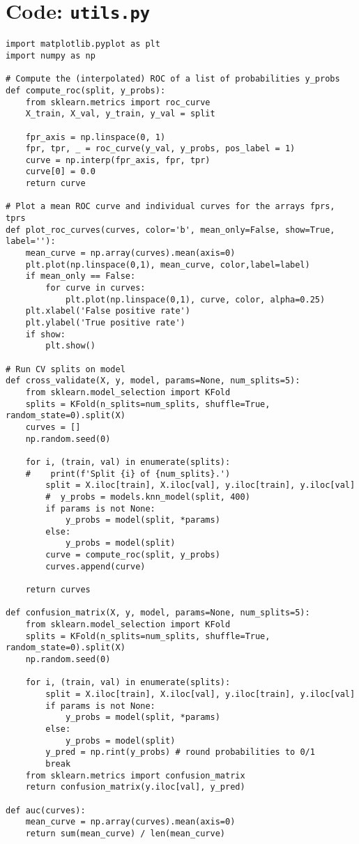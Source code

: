 \documentclass[11pt]{article}
\begin{document}
\section{Code: \texttt{utils.py}}
\begin{verbatim}
import matplotlib.pyplot as plt
import numpy as np

# Compute the (interpolated) ROC of a list of probabilities y_probs
def compute_roc(split, y_probs):
    from sklearn.metrics import roc_curve
    X_train, X_val, y_train, y_val = split

    fpr_axis = np.linspace(0, 1)
    fpr, tpr, _ = roc_curve(y_val, y_probs, pos_label = 1)
    curve = np.interp(fpr_axis, fpr, tpr)
    curve[0] = 0.0
    return curve

# Plot a mean ROC curve and individual curves for the arrays fprs, tprs
def plot_roc_curves(curves, color='b', mean_only=False, show=True, label=''):
    mean_curve = np.array(curves).mean(axis=0)
    plt.plot(np.linspace(0,1), mean_curve, color,label=label)
    if mean_only == False:
        for curve in curves:
            plt.plot(np.linspace(0,1), curve, color, alpha=0.25)
    plt.xlabel('False positive rate')
    plt.ylabel('True positive rate')
    if show:
        plt.show()

# Run CV splits on model
def cross_validate(X, y, model, params=None, num_splits=5):
    from sklearn.model_selection import KFold
    splits = KFold(n_splits=num_splits, shuffle=True, random_state=0).split(X)
    curves = []
    np.random.seed(0)
    
    for i, (train, val) in enumerate(splits):
    #    print(f'Split {i} of {num_splits}.')
        split = X.iloc[train], X.iloc[val], y.iloc[train], y.iloc[val]
        #  y_probs = models.knn_model(split, 400)
        if params is not None:
            y_probs = model(split, *params)
        else:
            y_probs = model(split)
        curve = compute_roc(split, y_probs)
        curves.append(curve)

    return curves

def confusion_matrix(X, y, model, params=None, num_splits=5):
    from sklearn.model_selection import KFold
    splits = KFold(n_splits=num_splits, shuffle=True, random_state=0).split(X)
    np.random.seed(0)
    
    for i, (train, val) in enumerate(splits):
        split = X.iloc[train], X.iloc[val], y.iloc[train], y.iloc[val]
        if params is not None:
            y_probs = model(split, *params)
        else:
            y_probs = model(split)
        y_pred = np.rint(y_probs) # round probabilities to 0/1
        break
    from sklearn.metrics import confusion_matrix
    return confusion_matrix(y.iloc[val], y_pred)

def auc(curves):
    mean_curve = np.array(curves).mean(axis=0)
    return sum(mean_curve) / len(mean_curve)
\end{verbatim}
\end{document}
